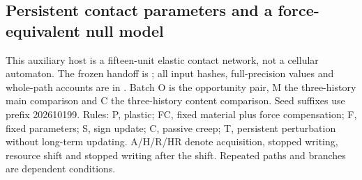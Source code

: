 \subsection*{Persistent contact parameters and a force-equivalent null model}
This auxiliary host is a fifteen-unit elastic contact network, not a cellular automaton. The frozen handoff is ; all input hashes, full-precision values and whole-path accounts are in . Batch O is the opportunity pair, M the three-history main comparison and C the three-history content comparison. Seed suffixes use prefix 202610199. Rules: P, plastic; FC, fixed material plus force compensation; F, fixed parameters; S, sign update; C, passive creep; T, persistent perturbation without long-term updating. A/H/R/HR denote acquisition, stopped writing, resource shift and stopped writing after the shift. Repeated paths and branches are dependent conditions.
\begingroup\scriptsize\setlength{\tabcolsep}{3pt}

